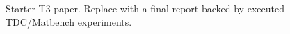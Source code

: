 \documentclass{article}
\begin{document}
Starter T3 paper. Replace with a final report backed by executed TDC/Matbench experiments.
\end{document}
